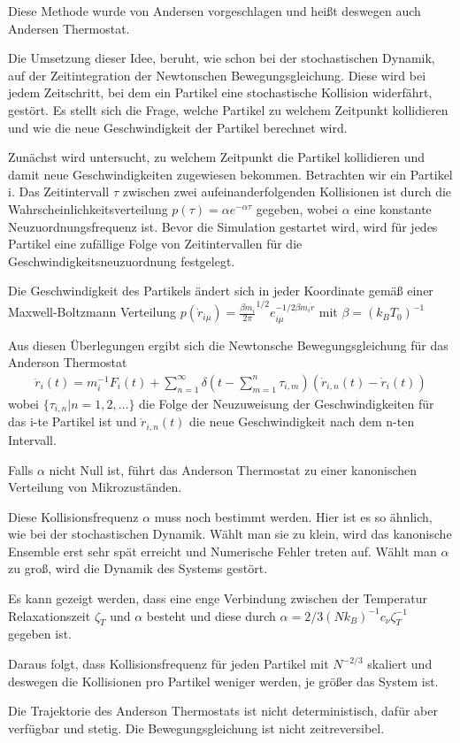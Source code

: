 \documentclass[]{article}
\begin{document}
Diese Methode wurde von Andersen vorgeschlagen und heißt deswegen auch Andersen Thermostat. 

Die Umsetzung dieser Idee, beruht, wie schon bei der stochastischen Dynamik, auf der Zeitintegration der Newtonschen Bewegungsgleichung. Diese wird bei jedem Zeitschritt, bei dem ein Partikel eine stochastische Kollision widerfährt,  gestört. Es stellt sich die Frage, welche Partikel zu welchem Zeitpunkt kollidieren und wie die neue Geschwindigkeit der Partikel berechnet wird.  

Zunächst wird untersucht, zu welchem Zeitpunkt die Partikel kollidieren und damit neue Geschwindigkeiten zugewiesen bekommen. Betrachten wir ein Partikel i. Das Zeitintervall $\tau$ zwischen zwei aufeinanderfolgenden Kollisionen ist durch die Wahrscheinlichkeitsverteilung $p(\tau)= \alpha e^{- \alpha \tau}$ gegeben, wobei $\alpha$ eine konstante Neuzuordnungsfrequenz ist.
Bevor die Simulation gestartet wird, wird für jedes Partikel eine zufällige Folge von Zeitintervallen für die Geschwindigkeitsneuzuordnung festgelegt. 

Die Geschwindigkeit des Partikels ändert sich in jeder Koordinate gemäß einer Maxwell-Boltzmann Verteilung $p(\dot{r}_{i \mu}) = {\frac{\beta m_i}{2 \pi}}^{1/2} e^{-1/2 \beta m_i \dot{r}}_{i \mu}$ mit $\beta = (k_B T_0)^{-1}$
  
Aus diesen Überlegungen ergibt sich die Newtonsche Bewegungsgleichung für das Anderson Thermostat
\begin{align*}
	\ddot{r}_i(t) = m_i^{-1} F_i(t) + \sum\limits_{n=1}^{\infty} \delta \left(  t - \sum\limits_{m=1}^n \tau_{i,m}\right) \left( \dot{r}_{i,n}(t) - \dot{r}_i(t) \right)
\end{align*}  
wobei $\{\tau_{i,n}| n=1,2, \dots\}$ die Folge der Neuzuweisung der Geschwindigkeiten für das i-te Partikel ist und $\dot{r}_{i,n}(t)$ die neue Geschwindigkeit nach dem n-ten Intervall.
 
Falls $\alpha $ nicht Null ist, führt das Anderson Thermostat zu einer kanonischen Verteilung von Mikrozuständen. 

Diese Kollisionsfrequenz $\alpha$ muss noch bestimmt werden. Hier ist es so ähnlich, wie bei der stochastischen Dynamik. Wählt man sie zu klein, wird das kanonische Ensemble erst sehr spät erreicht und Numerische Fehler treten auf. Wählt man $\alpha$ zu groß, wird die Dynamik des Systems gestört.

Es kann gezeigt werden, dass eine enge Verbindung zwischen der Temperatur Relaxationszeit $ \zeta_T$ und $\alpha$ besteht und diese durch $\alpha = 2/3 (N k_B)^{-1} c_{\nu} \zeta_T^{-1}$ gegeben ist. 

Daraus folgt, dass Kollisionsfrequenz für jeden Partikel mit $N^{-2/3}$ skaliert und deswegen die Kollisionen pro Partikel weniger werden, je größer das System ist. 

Die Trajektorie des Anderson Thermostats ist nicht deterministisch, dafür aber verfügbar und stetig. Die Bewegungsgleichung ist nicht zeitreversibel.

\end{document}
